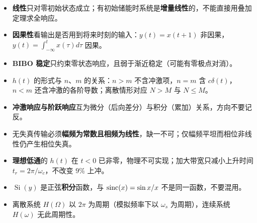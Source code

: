 \begin{itemize}
\item \textbf{线性}只对零初始状态成立；有初始储能时系统是\textbf{增量线性}的，不能直接用叠加定理求全响应。
\item \textbf{因果性}看输出是否用到将来时刻的输入：$y(t)=x(t+1)$ 非因果，$y(t)=\int_{-\infty}^{t}x(\tau)d\tau$ 因果。
\item \textbf{BIBO 稳定}只约束零状态响应，且弱于渐近稳定（可能有零极点对消）。
\item $h(t)$ 的形式与 $n$、$m$ 的关系：$n>m$ 不含冲激项，$n=m$ 含 $c\delta(t)$，$n<m$ 还含冲激的各阶导数；离散情形对应 $N>M$ 与 $N\le M$。
\item \textbf{冲激响应与阶跃响应}互为微分（后向差分）与积分（累加）关系，方向不要记反。
\item 无失真传输必须\textbf{幅频为常数且相频为线性}，缺一不可；仅幅频平坦而相位非线性仍产生相位失真。
\item \textbf{理想低通}的 $h(t)$ 在 $t<0$ 已非零，物理不可实现；加大带宽只减小上升时间 $t_r=2\pi/\omega_c$，不改变 $9\%$ 上冲。
\item $\operatorname{Si}(y)$ 是正弦\textbf{积分}函数，与 $\operatorname{sinc}(x)=\sin x/x$ 不是同一函数，不要混用。
\item 离散系统 $H(\Omega)$ 以 $2\pi$ 为周期（模拟频率下以 $\omega_s$ 为周期），连续系统 $H(\omega)$ 无此周期性。
\end{itemize}
